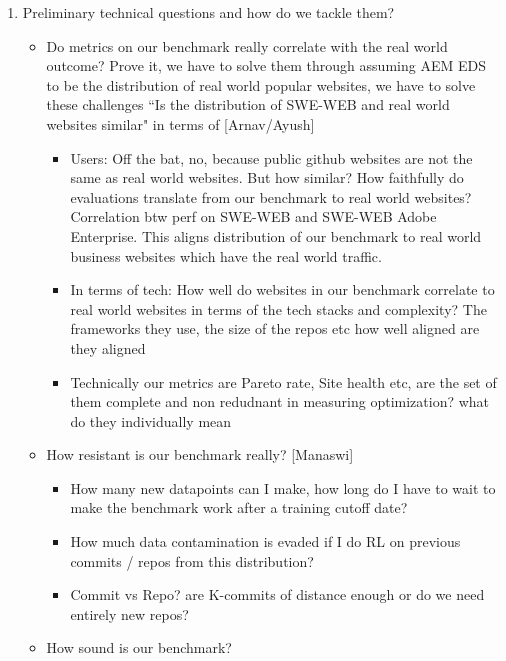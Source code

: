 \begin{enumerate}
\begin{itemize}
        \item The problems, solutions, and data points in our benchmark are diverse, and because its a live/evolving bench, it measures longitudnal capabilities both past and cutting edge tech.
    \end{itemize}
    \item Preliminary technical questions and how do we tackle them?
    \begin{itemize}
    \item Do metrics on our benchmark really correlate with the real world outcome? Prove it, we have to solve them through assuming AEM EDS to be the distribution of real world popular websites, we have to solve these challenges ``Is the distribution of SWE-WEB and real world websites similar" in terms of [Arnav/Ayush]
    \begin{itemize}
        \item Users: Off the bat, no, because public github websites are not the same as real world websites. But how similar? How faithfully do evaluations translate from our benchmark to real world websites? Correlation btw perf on SWE-WEB and SWE-WEB Adobe Enterprise. This aligns distribution of our benchmark to real world business websites which have the real world traffic.
        \item In terms of tech: How well do websites in our benchmark correlate to real world websites in terms of the tech stacks and complexity? The frameworks they use, the size of the repos etc how well aligned are they aligned
        \item Technically our metrics are Pareto rate, Site health etc, are the set of them complete and non redudnant in measuring optimization? what do they individually mean
    \end{itemize}
    \item How resistant is our benchmark really? [Manaswi]
    \begin{itemize}
        \item How many new datapoints can I make, how long do I have to wait to make the benchmark work after a training cutoff date?
        \item How much data contamination is evaded if I do RL on previous commits / repos from this distribution? 
        \item Commit vs Repo? are K-commits of distance enough or do we need entirely new repos?
    \end{itemize}
    \item How sound is our benchmark?

\end{itemize}
\end{enumerate}
